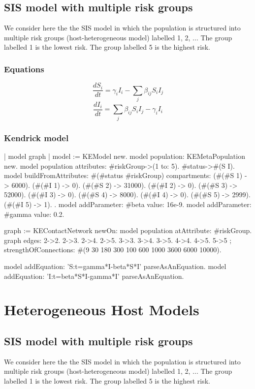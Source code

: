 \documentclass[a4paper,10pt,twoside]{book}
\begin{document}
\section{ SIS model with multiple risk groups}
We consider here the the SIS model in which the population is structured into multiple risk groups (host-heterogeneous model) labelled 1, 2, ...
The group labelled 1 is the lowest risk. The group labelled 5 is the highest risk.
\subsection{ Equations}

  \begin{equation}
    \frac{dS_i}{dt} = \gamma_i I_i - \sum_j \beta_{ij} S_i I_j
  \end{equation}
  \begin{equation}
    \frac{dI_i}{dt} = \sum_j \beta_{ij} S_i I_j - \gamma_i I_i
  \end{equation}
  
\subsection{ Kendrick model}

\begin{code}{}
| model graph |
	model := KEModel new.
	model population: KEMetaPopulation new.
	model population attributes: {#riskGroup->(1 to: 5). #status->#(S I)}.
	model
		buildFromAttributes: #(#status #riskGroup)
		compartments: {
		  (#(#S 1) -> 6000). (#(#I 1) -> 0).
        (#(#S 2) -> 31000). (#(#I 2) -> 0).
        (#(#S 3) -> 52000). (#(#I 3) -> 0).
        (#(#S 4) -> 8000). (#(#I 4) -> 0).
        (#(#S 5) -> 2999). (#(#I 5) -> 1).
		}.
	model addParameter: #beta value: 16e-9.
	model addParameter: #gamma value: 0.2.

	graph := KEContactNetwork
					newOn: model population
					atAttribute: #riskGroup.
	graph edges: { 2->2. 2->3. 2->4. 2->5. 3->3. 3->4. 3->5. 4->4. 4->5. 5->5 };
			strengthOfConnections: #(9 30 180 300 100 600 1000 3600 6000 10000).

	model addEquation: 'S:t=gamma*I-beta*S*I' parseAsAnEquation.
	model addEquation: 'I:t=beta*S*I-gamma*I' parseAsAnEquation.
\end{code}

\chapter{ Heterogeneous Host Models}\section{ SIS model with multiple risk groups}
We consider here the the SIS model in which the population is structured into multiple risk groups (host-heterogeneous model) labelled 1, 2, ...
The group labelled 1 is the lowest risk. The group labelled 5 is the highest risk.
\end{document}
